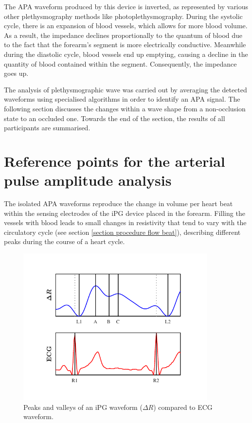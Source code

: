 The APA waveform produced by this device is inverted, as represented by various other plethysmography methods like photoplethysmography. During the systolic cycle, there is an expansion of blood vessels, which allows for more blood volume. As a result, the impedance declines proportionally to the quantum of blood due to the fact that the forearm's segment is more electrically conductive. Meanwhile during the diastolic cycle, blood vessels end up emptying, causing a decline in the quantity of blood contained within the segment. Consequently, the impedance goes up.

The analysis of plethysmographic wave was carried out by averaging the detected waveforms using specialised algorithms in order to identify an APA signal. The following section discusses the changes within a wave shape from a non-occlusion state to an occluded one. Towards the end of the section, the results of all participants are summarised.

\section{Reference points for the arterial pulse amplitude analysis}
\label{section apa 1}
The isolated APA waveforms reproduce the change in volume per heart beat within the sensing electrodes of the iPG device placed in the forearm. Filling the vessels with blood leads to small changes in resistivity that tend to vary with the circulatory cycle (see section \ref{section procedure flow beat}), describing different peaks during the course of a heart cycle.

\begin{figure}[!htpb]
	\centering
	\includegraphics[width=10cm,keepaspectratio]{figure_apa_1}
	\caption[Marker ppoints in an iPG waveform]{Peaks and valleys of an iPG waveform ($\Delta R$) compared to ECG waveform.}
	\label{fig:markers iPG}
\end{figure}

